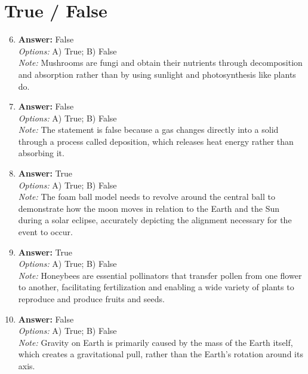 \documentclass[12pt]{article}
\begin{document}
\section*{True / False}
\begin{enumerate}[label=\arabic*.]
\setcounter{enumi}{5}
\item \textbf{Answer:} False
\\ \textit{Options:} A) True; B) False
\\ \textit{Note:} Mushrooms are fungi and obtain their nutrients through decomposition and absorption rather than by using sunlight and photosynthesis like plants do.
\item \textbf{Answer:} False
\\ \textit{Options:} A) True; B) False
\\ \textit{Note:} The statement is false because a gas changes directly into a solid through a process called deposition, which releases heat energy rather than absorbing it.
\item \textbf{Answer:} True
\\ \textit{Options:} A) True; B) False
\\ \textit{Note:} The foam ball model needs to revolve around the central ball to demonstrate how the moon moves in relation to the Earth and the Sun during a solar eclipse, accurately depicting the alignment necessary for the event to occur.
\item \textbf{Answer:} True
\\ \textit{Options:} A) True; B) False
\\ \textit{Note:} Honeybees are essential pollinators that transfer pollen from one flower to another, facilitating fertilization and enabling a wide variety of plants to reproduce and produce fruits and seeds.
\item \textbf{Answer:} False
\\ \textit{Options:} A) True; B) False
\\ \textit{Note:} Gravity on Earth is primarily caused by the mass of the Earth itself, which creates a gravitational pull, rather than the Earth's rotation around its axis.
\end{enumerate}
\end{document}

